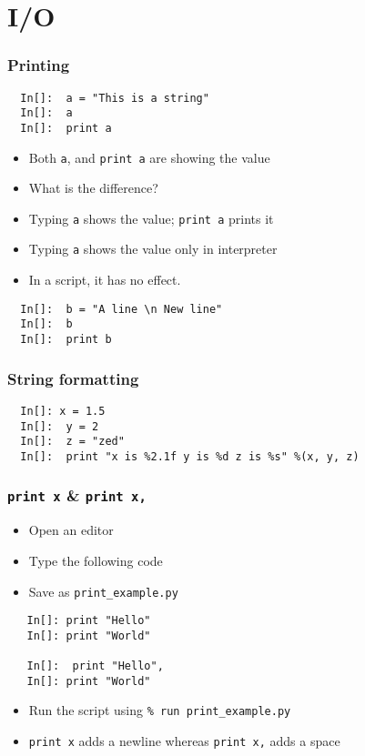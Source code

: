 \section{I/O}

\begin{frame}[fragile]
  \frametitle{Printing}
  \begin{lstlisting}
  In[]:  a = "This is a string"
  In[]:  a
  In[]:  print a
  \end{lstlisting}
  \begin{itemize}
  \item Both \texttt{a}, and \texttt{print a} are showing the value
  \item What is the difference?
  \item Typing \texttt{a} shows the value; \texttt{print a} prints it
  \item Typing \texttt{a} shows the value only in interpreter
  \item In a script, it has no effect. 
  \end{itemize}
  \begin{lstlisting}
  In[]:  b = "A line \n New line"
  In[]:  b
  In[]:  print b
  \end{lstlisting}
\end{frame}

\begin{frame}[fragile]
  \frametitle{String formatting}
  \begin{lstlisting}
  In[]: x = 1.5
  In[]:  y = 2
  In[]:  z = "zed"
  In[]:  print "x is %2.1f y is %d z is %s" %(x, y, z)
  \end{lstlisting}
\end{frame}

\begin{frame}[fragile]
  \frametitle{\texttt{print x} \& \texttt{print x,}}
  \begin{itemize}
  \item Open an editor
  \item Type the following code
  \item Save as \texttt{print\_example.py}
  \end{itemize}
  \begin{lstlisting}
   In[]: print "Hello"
   In[]: print "World"

   In[]:  print "Hello",
   In[]: print "World"
  \end{lstlisting}
  \begin{itemize}
  \item Run the script using \texttt{\% run print\_example.py}
  \item \texttt{print x} adds a newline whereas \texttt{print x,} adds
    a space
  \end{itemize}
\end{frame}


